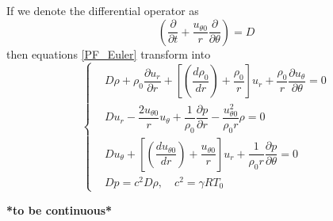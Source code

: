 If we denote the differential operator as
\begin{equation}
	\left(\dfrac{\partial}{\partial t} + \dfrac{u_{\theta 0}}{r}\dfrac{\partial}{\partial \theta}\right) = D
\end{equation}
then equations \eqref{PF_Euler} transform into
\begin{equation}
	\left\{
	\begin{aligned}
		& D\rho + \rho_0\dfrac{\partial u_r}{\partial r} + \left[\left(\dfrac{d \rho_0}{dr}\right) + \dfrac{\rho_0}{r}\right] u_r + \dfrac{\rho_0}{r}\dfrac{\partial u_{\theta}}{\partial \theta} = 0 \\
		& D u_r - \dfrac{2 u_{\theta 0}}{r}u_{\theta} + \dfrac{1}{\rho_0}\dfrac{\partial p}{\partial r} - \dfrac{u_{\theta 0}^2}{\rho_0 r}\rho = 0 \\
		& D u_\theta + \left[\left(\dfrac{du_{\theta 0}}{dr}\right) + \dfrac{u_{\theta 0}}{r}\right] u_r + \dfrac{1}{\rho_0 r}\dfrac{\partial p}{\partial \theta} = 0 \\
		& D p = c^2 D \rho, \quad c^2 = \gamma R T_0
	\end{aligned}
	\right.
\end{equation}

\textbf{*to be continuous*}